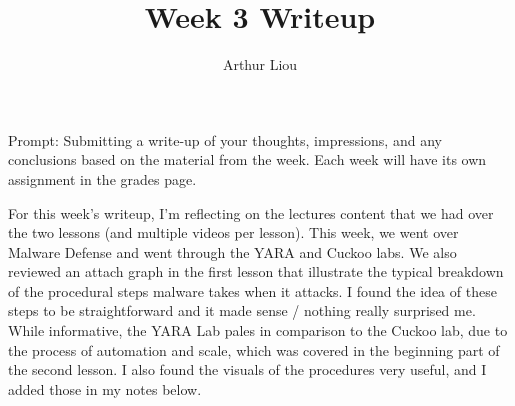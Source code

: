 \documentclass[12pt]{article}
\begin{document}
 
 
\title{Week 3 Writeup}
\author{Arthur Liou}

\maketitle

Prompt: Submitting a write-up of your thoughts, impressions, and any conclusions based on the material from the week. Each week will have its own assignment in the grades page.
\par
\linebreak
	For this week’s writeup, I’m reflecting on the lectures content that we had over the two lessons (and multiple videos per lesson). This week, we went over Malware Defense and went through the YARA and Cuckoo labs. We also reviewed an attach graph in the first lesson that illustrate the typical breakdown of the procedural steps malware takes when it attacks. I found the idea of these steps to be straightforward and it made sense / nothing really surprised me. While informative, the YARA Lab pales in comparison to the Cuckoo lab, due to the process of automation and scale, which was covered in the beginning part of the second lesson. I also found the visuals of the procedures very useful, and I added those in my notes below.
\end{document}
